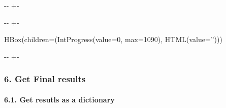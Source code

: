 \documentclass[letterpaper,10pt,english]{sphinxmanual}
\newlength\nbsphinxcodecellspacing
\begin{document}
{

\kern-\sphinxverbatimsmallskipamount\kern-\baselineskip
\kern+\FrameHeightAdjust\kern-\fboxrule
\vspace{\nbsphinxcodecellspacing}

\begin{sphinxVerbatim}[commandchars=\\\{\}]

\end{sphinxVerbatim}
}

{

\kern-\sphinxverbatimsmallskipamount\kern-\baselineskip
\kern+\FrameHeightAdjust\kern-\fboxrule
\vspace{\nbsphinxcodecellspacing}

\begin{sphinxVerbatim}[commandchars=\\\{\}]
HBox(children=(IntProgress(value=0, max=1090), HTML(value='')))
\end{sphinxVerbatim}
}

{

\kern-\sphinxverbatimsmallskipamount\kern-\baselineskip
\kern+\FrameHeightAdjust\kern-\fboxrule
\vspace{\nbsphinxcodecellspacing}

\begin{sphinxVerbatim}[commandchars=\\\{\}]

\end{sphinxVerbatim}
}


\subsubsection{6. Get Final results}
\label{\detokenize{notebooks/02_motif_scan/02_atac_peaks_to_TFinfo_with_celloracle_190901:6.-Get-Final-results}}

\paragraph{6.1. Get resutls as a dictionary}
\label{\detokenize{notebooks/02_motif_scan/02_atac_peaks_to_TFinfo_with_celloracle_190901:6.1.-Get-resutls-as-a-dictionary}}
{
\begin{sphinxVerbatim}[commandchars=\\\{\}]
\llap{\color{nbsphinxin}[18]:\,\hspace{\fboxrule}\hspace{\fboxsep}}  

\end{sphinxVerbatim}
}
\end{document}
